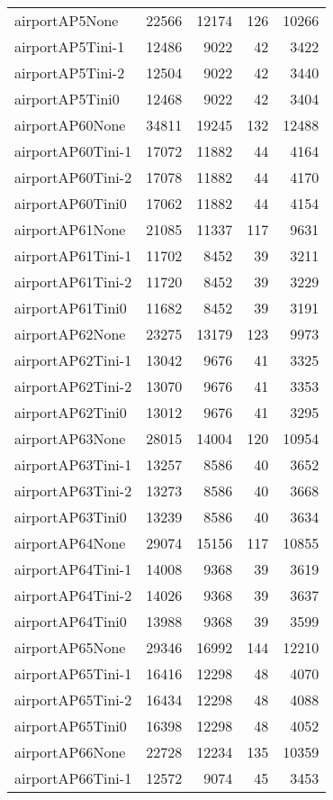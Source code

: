 \begin{longtable}{lrrrr}
airportAP5None & 22566 & 12174 & 126 & 10266 \\
airportAP5Tini-1 & 12486 & 9022 & 42 & 3422 \\
airportAP5Tini-2 & 12504 & 9022 & 42 & 3440 \\
airportAP5Tini0 & 12468 & 9022 & 42 & 3404 \\
airportAP60None & 34811 & 19245 & 132 & 12488 \\
airportAP60Tini-1 & 17072 & 11882 & 44 & 4164 \\
airportAP60Tini-2 & 17078 & 11882 & 44 & 4170 \\
airportAP60Tini0 & 17062 & 11882 & 44 & 4154 \\
airportAP61None & 21085 & 11337 & 117 & 9631 \\
airportAP61Tini-1 & 11702 & 8452 & 39 & 3211 \\
airportAP61Tini-2 & 11720 & 8452 & 39 & 3229 \\
airportAP61Tini0 & 11682 & 8452 & 39 & 3191 \\
airportAP62None & 23275 & 13179 & 123 & 9973 \\
airportAP62Tini-1 & 13042 & 9676 & 41 & 3325 \\
airportAP62Tini-2 & 13070 & 9676 & 41 & 3353 \\
airportAP62Tini0 & 13012 & 9676 & 41 & 3295 \\
airportAP63None & 28015 & 14004 & 120 & 10954 \\
airportAP63Tini-1 & 13257 & 8586 & 40 & 3652 \\
airportAP63Tini-2 & 13273 & 8586 & 40 & 3668 \\
airportAP63Tini0 & 13239 & 8586 & 40 & 3634 \\
airportAP64None & 29074 & 15156 & 117 & 10855 \\
airportAP64Tini-1 & 14008 & 9368 & 39 & 3619 \\
airportAP64Tini-2 & 14026 & 9368 & 39 & 3637 \\
airportAP64Tini0 & 13988 & 9368 & 39 & 3599 \\
airportAP65None & 29346 & 16992 & 144 & 12210 \\
airportAP65Tini-1 & 16416 & 12298 & 48 & 4070 \\
airportAP65Tini-2 & 16434 & 12298 & 48 & 4088 \\
airportAP65Tini0 & 16398 & 12298 & 48 & 4052 \\
airportAP66None & 22728 & 12234 & 135 & 10359 \\
airportAP66Tini-1 & 12572 & 9074 & 45 & 3453 \\

\end{longtable}
